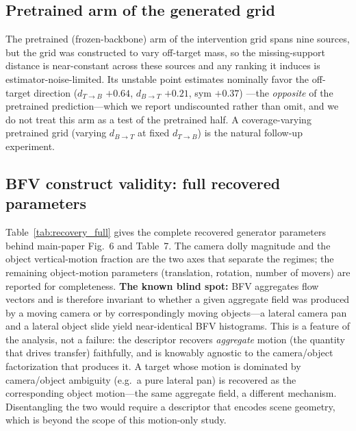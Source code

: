 \documentclass[runningheads]{llncs}
\newcommand{\dtb}{d_{T\to B}}
\newcommand{\dbt}{d_{B\to T}}
\begin{document}
\subsection{Pretrained arm of the generated grid}
The pretrained (frozen-backbone) arm of the intervention grid spans nine
sources, but the grid was constructed to vary off-target mass, so the
missing-support distance is near-constant across these sources and any ranking
it induces is estimator-noise-limited. Its unstable point estimates nominally
favor the off-target direction ($\dtb$ $+0.64$, $\dbt$ $+0.21$, sym $+0.37$)
---the \emph{opposite} of the pretrained prediction---which we report
undiscounted rather than omit, and we do not treat this arm as a test of the
pretrained half. A coverage-varying pretrained grid (varying $\dbt$ at fixed
$\dtb$) is the natural follow-up experiment.

\subsection{BFV construct validity: full recovered parameters}
Table~\ref{tab:recovery_full} gives the complete recovered generator
parameters behind main-paper Fig.~6 and Table~7. The camera dolly magnitude and the object
vertical-motion fraction are the two axes that separate the regimes; the
remaining object-motion parameters (translation, rotation, number of movers)
are reported for completeness. \textbf{The known blind spot:} BFV aggregates
flow vectors and is therefore invariant to whether a given aggregate field was
produced by a moving camera or by correspondingly moving objects---a lateral
camera pan and a lateral object slide yield near-identical BFV histograms. This
is a feature of the analysis, not a failure: the descriptor recovers
\emph{aggregate} motion (the quantity that drives transfer) faithfully, and is
knowably agnostic to the camera/object factorization that produces it. A
target whose motion is dominated by camera/object ambiguity (e.g.\ a pure
lateral pan) is recovered as the corresponding object motion---the same
aggregate field, a different mechanism. Disentangling the two would require a
descriptor that encodes scene geometry, which is beyond the scope of this
motion-only study.

\begin{table}[h]
\centering
\caption{Full recovered generator parameters from BFV-only search.}
\label{tab:recovery_full}
\small

\end{table}
\end{document}

